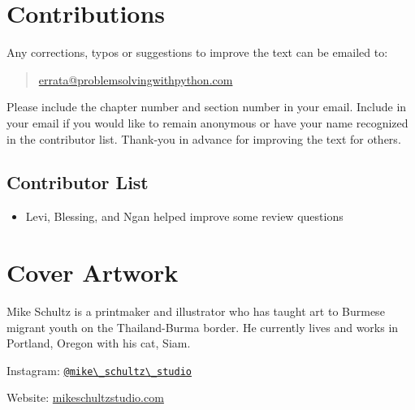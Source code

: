 \documentclass{book}
\providecommand{\tightlist}{%
      \setlength{\itemsep}{0pt}\setlength{\parskip}{0pt}}
\newcommand{\passthrough}[1]{#1}
\begin{document}
    
        \hypertarget{contributions}{%
\section{Contributions}\label{contributions}}
    




    
        Any corrections, typos or suggestions to improve the text can be emailed
to:

\begin{quote}
\url{errata@problemsolvingwithpython.com}
\end{quote}

Please include the chapter number and section number in your email.
Include in your email if you would like to remain anonymous or have your
name recognized in the contributor list. Thank-you in advance for
improving the text for others.
    




    
        \hypertarget{contributor-list}{%
\subsection{Contributor List}\label{contributor-list}}

\begin{itemize}
\tightlist
\item
  Levi, Blessing, and Ngan helped improve some review questions
\end{itemize}
    




    
        \hypertarget{cover-artwork}{%
\section{Cover Artwork}\label{cover-artwork}}
    




    
        Mike Schultz is a printmaker and illustrator who has taught art to
Burmese migrant youth on the Thailand-Burma border. He currently lives
and works in Portland, Oregon with his cat, Siam.

Instagram:
\href{https://www.instagram.com/mike_schultz_studio/}{\passthrough{\lstinline!@mike\_schultz\_studio!}}

Website:
\href{http://mikeschultzstudio.squarespace.com/}{mikeschultzstudio.com}
    
\end{document}
